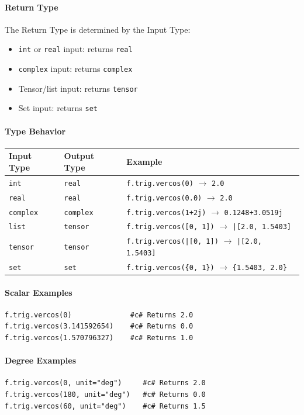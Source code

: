\paragraph{Return Type}
The Return Type is determined by the Input Type:
\begin{itemize}
\item \texttt{int} or \texttt{real} input: returns \texttt{real}
\item \texttt{complex} input: returns \texttt{complex}
\item Tensor/list input: returns \texttt{tensor}
\item Set input: returns \texttt{set}
\end{itemize}

\paragraph{Type Behavior}
\begin{center}
\begin{tabular}{lll}
\textbf{Input Type} & \textbf{Output Type} & \textbf{Example} \\ \hline
\texttt{int} & \texttt{real} & \texttt{f.trig.vercos(0)} $\to$ \texttt{2.0} \\
\texttt{real} & \texttt{real} & \texttt{f.trig.vercos(0.0)} $\to$ \texttt{2.0} \\
\texttt{complex} & \texttt{complex} & \texttt{f.trig.vercos(1+2j)} $\to$ \texttt{0.1248+3.0519j} \\
\texttt{list} & \texttt{tensor} & \texttt{f.trig.vercos([0, 1])} $\to$ \texttt{|[2.0, 1.5403]} \\
\texttt{tensor} & \texttt{tensor} & \texttt{f.trig.vercos(|[0, 1])} $\to$ \texttt{|[2.0, 1.5403]} \\
\texttt{set} & \texttt{set} & \texttt{f.trig.vercos(\{0, 1\})} $\to$ \texttt{\{1.5403, 2.0\}} \\
\end{tabular}
\end{center}

\paragraph{Scalar Examples}
\begin{verbatim}
f.trig.vercos(0)              #c# Returns 2.0
f.trig.vercos(3.141592654)    #c# Returns 0.0
f.trig.vercos(1.570796327)    #c# Returns 1.0
\end{verbatim}

\paragraph{Degree Examples}
\begin{verbatim}
f.trig.vercos(0, unit="deg")     #c# Returns 2.0
f.trig.vercos(180, unit="deg")   #c# Returns 0.0
f.trig.vercos(60, unit="deg")    #c# Returns 1.5
\end{verbatim}

